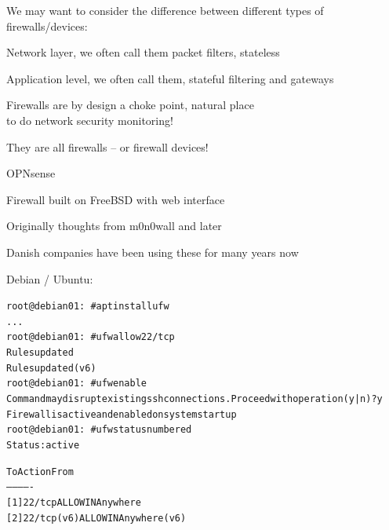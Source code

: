 \documentclass[Screen16to9,17pt]{foils}
\begin{document}

We may want to consider the difference between different types of firewalls/devices:
\begin{list2}
\item Network layer, we often call them packet filters, stateless
\item Application level, we often call them, stateful filtering and gateways
\item Firewalls are by design a choke point, natural place \\
to do network security monitoring!
\end{list2}

They are all firewalls -- or firewall devices!





\begin{list2}
\item OPNsense 
\item Firewall built on FreeBSD with web interface
\item Originally thoughts from m0n0wall and later \\
\item Danish companies have been using these for many years now
\end{list2}




Debian / Ubuntu:
\begin{alltt}\scriptsize
root@debian01:~# apt install ufw
...
root@debian01:~# ufw allow 22/tcp
Rules updated
Rules updated (v6)
root@debian01:~# ufw enable
Command may disrupt existing ssh connections. Proceed with operation (y|n)? y
Firewall is active and enabled on system startup
root@debian01:~# ufw status numbered
Status: active

     To                         Action      From
     --                         ------      ----
[ 1] 22/tcp                     ALLOW IN    Anywhere
[ 2] 22/tcp (v6)                ALLOW IN    Anywhere (v6)
\end{alltt}
\end{document}
